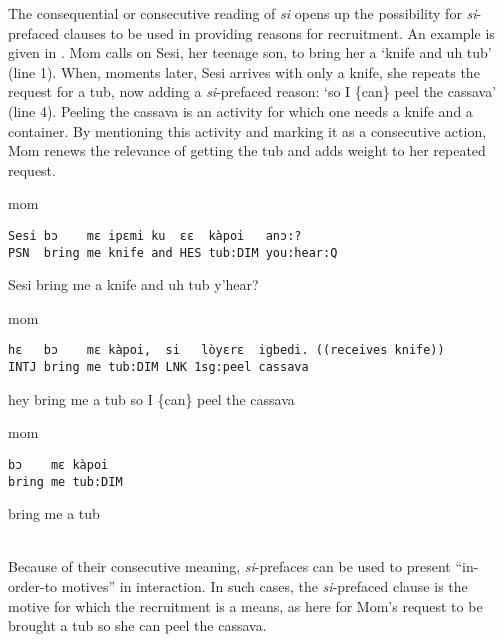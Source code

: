 \documentclass[output=paper]{langsci/langscibook}
\begin{document}
\normalsize
The consequential or consecutive reading of \textit{si} opens up the possibility for \textit{si}-prefaced clauses to be used in providing reasons for recruitment. An example is given in . Mom calls on Sesi, her teenage son, to bring her a ‘knife and uh tub’  (line 1). When, moments later, Sesi arrives with only a knife, she repeats the request for a tub, now adding a \textit{si}-prefaced reason: ‘so I \{can\} peel the cassava’ (line 4). Peeling the cassava is an activity for which one needs a knife and a container. By mentioning this activity and marking it as a consecutive action, Mom renews the relevance of getting the tub and adds weight to her repeated request.

\vspace{2mm}
%
\begin{transbox}{1}{mom}
\begin{verbatim}
Sesi bɔ    mɛ ipɛmi ku  ɛɛ  kàpoi   anɔ:?
PSN  bring me knife and HES tub:DIM you:hear:Q
\end{verbatim}
Sesi bring me a knife and uh tub y’hear?
\end{transbox}
%
%
%
\begin{mdframednoverticalspace}[style=firstfoc]
\begin{transbox}{4}{mom}
\begin{verbatim}
hɛ   bɔ    mɛ kàpoi,  si   lòyɛrɛ  igbedi. ((receives knife))
INTJ bring me tub:DIM LNK 1sg:peel cassava
\end{verbatim}
hey bring me a tub so I \{can\} peel the cassava
\end{transbox}
\end{mdframednoverticalspace}
%
%
\begin{transbox}{6}{mom}
\begin{verbatim}
bɔ    mɛ kàpoi
bring me tub:DIM
\end{verbatim}
bring me a tub
\end{transbox}
%
%
\vspace{-1mm}
%
\\

\normalsize
Because of their consecutive meaning, \textit{si}-prefaces can be used to present “in-order-to motives” \citep{schutz_common-sense_1962} in interaction. In such cases, the \textit{si}-prefaced clause is the motive for which the recruitment is a means, as here for Mom’s request to be brought a tub so she can peel the cassava.
\end{document}
